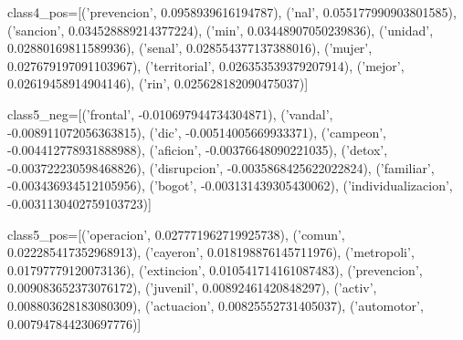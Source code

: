  class4_pos=[('prevencion', 0.0958939616194787),
 ('nal', 0.055177990903801585),
 ('sancion', 0.034528889214377224),
 ('min', 0.03448907050239836),
 ('unidad', 0.02880169811589936),
 ('senal', 0.028554377137388016),
 ('mujer', 0.027679197091103967),
 ('territorial', 0.026353539379207914),
 ('mejor', 0.02619458914904146),
 ('rin', 0.025628182090475037)]
 
 class5_neg=[('frontal', -0.010697944734304871),
 ('vandal', -0.008911072056363815),
 ('dic', -0.00514005669933371),
 ('campeon', -0.004412778931888988),
 ('aficion', -0.00376648090221035),
 ('detox', -0.003722230598468826),
 ('disrupcion', -0.0035868425622022824),
 ('familiar', -0.003436934512105956),
 ('bogot', -0.003131439305430062),
 ('individualizacion', -0.0031130402759103723)]
 
 class5_pos=[('operacion', 0.027771962719925738),
 ('comun', 0.022285417352968913),
 ('cayeron', 0.018198876145711976),
 ('metropoli', 0.01797779120073136),
 ('extincion', 0.010541714161087483),
 ('prevencion', 0.009083652373076172),
 ('juvenil', 0.00892461420848297),
 ('activ', 0.008803628183080309),
 ('actuacion', 0.00825552731405037),
 ('automotor', 0.007947844230697776)]
 
 